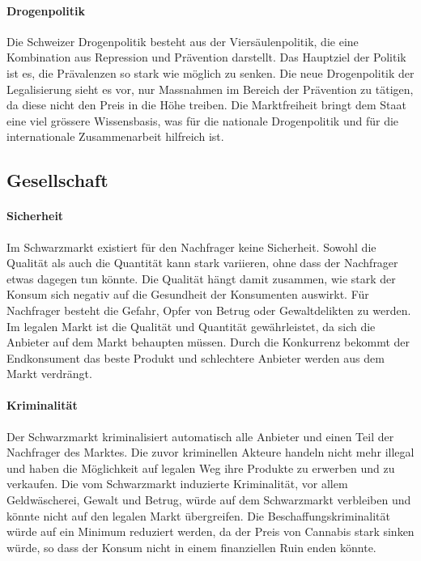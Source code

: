 \documentclass[../main.tex]{subfiles}
\begin{document}
	\paragraph{Drogenpolitik}
	Die Schweizer Drogenpolitik besteht aus der Viersäulenpolitik, die eine Kombination aus Repression und Prävention darstellt.
	Das Hauptziel der Politik ist es, die Prävalenzen so stark wie möglich zu senken.
	Die neue Drogenpolitik der Legalisierung sieht es vor, nur Massnahmen im Bereich der Prävention zu tätigen, da diese nicht den Preis in die Höhe treiben.
	Die Marktfreiheit bringt dem Staat eine viel grössere Wissensbasis, was für die nationale Drogenpolitik und für die internationale Zusammenarbeit hilfreich ist.
	
	
	
	\subsection{Gesellschaft}
	
	\paragraph{Sicherheit}
	Im Schwarzmarkt existiert für den Nachfrager keine Sicherheit.
	Sowohl die Qualität als auch die Quantität kann stark variieren, ohne dass der Nachfrager etwas dagegen tun könnte.
	Die Qualität hängt damit zusammen, wie stark der Konsum sich negativ auf die Gesundheit der Konsumenten auswirkt.
	Für Nachfrager besteht die Gefahr, Opfer von Betrug oder Gewaltdelikten zu werden.
	Im legalen Markt ist die Qualität und Quantität gewährleistet, da sich die Anbieter auf dem Markt behaupten müssen.
	Durch die Konkurrenz bekommt der Endkonsument das beste Produkt und schlechtere Anbieter werden aus dem Markt verdrängt.
	
	
	
	\paragraph{Kriminalität}
	Der Schwarzmarkt kriminalisiert automatisch alle Anbieter und einen Teil der Nachfrager des Marktes.
	Die zuvor kriminellen Akteure handeln nicht mehr illegal und haben die Möglichkeit auf legalen Weg ihre Produkte zu erwerben und zu verkaufen.
	Die vom Schwarzmarkt induzierte Kriminalität, vor allem Geldwäscherei, Gewalt und Betrug, würde auf dem Schwarzmarkt verbleiben und könnte nicht auf den legalen Markt übergreifen.
	Die Beschaffungskriminalität würde auf ein Minimum reduziert werden, da der Preis von Cannabis stark sinken würde, so dass der Konsum nicht in einem finanziellen Ruin enden könnte.
	
\end{document}
